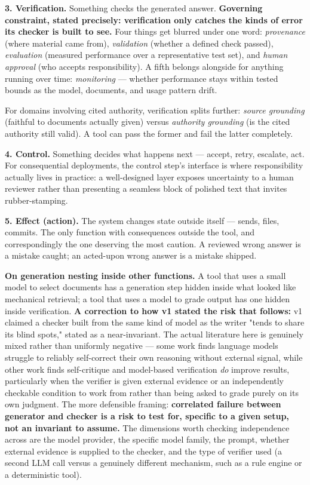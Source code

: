 \textbf{3. Verification.} Something checks the generated answer. \textbf{Governing constraint, stated precisely: verification only catches the kinds of error its checker is built to see.} Four things get blurred under one word: \emph{provenance} (where material came from), \emph{validation} (whether a defined check passed), \emph{evaluation} (measured performance over a representative test set), and \emph{human approval} (who accepts responsibility). A fifth belongs alongside for anything running over time: \emph{monitoring} --- whether performance stays within tested bounds as the model, documents, and usage pattern drift.

For domains involving cited authority, verification splits further: \emph{source grounding} (faithful to documents actually given) versus \emph{authority grounding} (is the cited authority still valid). A tool can pass the former and fail the latter completely.

\textbf{4. Control.} Something decides what happens next --- accept, retry, escalate, act. For consequential deployments, the control step's interface is where responsibility actually lives in practice: a well-designed layer exposes uncertainty to a human reviewer rather than presenting a seamless block of polished text that invites rubber-stamping.

\textbf{5. Effect (action).} The system changes state outside itself --- sends, files, commits. The only function with consequences outside the tool, and correspondingly the one deserving the most caution. A reviewed wrong answer is a mistake caught; an acted-upon wrong answer is a mistake shipped.

\textbf{On generation nesting inside other functions.} A tool that uses a small model to select documents has a generation step hidden inside what looked like mechanical retrieval; a tool that uses a model to grade output has one hidden inside verification. \textbf{A correction to how v1 stated the risk that follows:} v1 claimed a checker built from the same kind of model as the writer "tends to share its blind spots," stated as a near-invariant. The actual literature here is genuinely mixed rather than uniformly negative --- some work finds language models struggle to reliably self-correct their own reasoning without external signal, while other work finds self-critique and model-based verification \emph{do} improve results, particularly when the verifier is given external evidence or an independently checkable condition to work from rather than being asked to grade purely on its own judgment. The more defensible framing: \textbf{correlated failure between generator and checker is a risk to test for, specific to a given setup, not an invariant to assume.} The dimensions worth checking independence across are the model provider, the specific model family, the prompt, whether external evidence is supplied to the checker, and the type of verifier used (a second LLM call versus a genuinely different mechanism, such as a rule engine or a deterministic tool).

